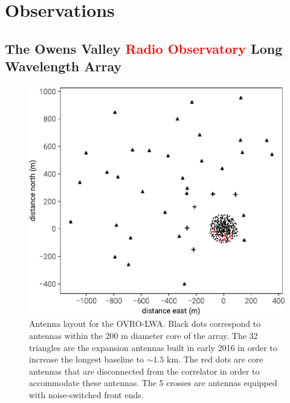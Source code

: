 \documentclass[twocolumn]{aastex61}
\newcommand{\revision}[1]{\textcolor{red}{\textbf{#1}}}
\begin{document}
\section{Observations}\label{sec:observations}

\subsection{The Owens Valley \revision{Radio Observatory} Long Wavelength Array}

\begin{figure}[t]
    \includegraphics[width=\columnwidth]{figures/antenna-layout/antenna-layout}
    \caption{
        Antenna layout for the OVRO-LWA. Black dots correspond to antennas within the 200 m diameter
        core of the array. The 32 triangles are the expansion antennas built in early 2016 in order
        to increase the longest baseline to $\sim1.5$ km. The red dots are core antennas that are
        disconnected from the correlator in order to accommodate these antennas. The 5 crosses are
        antennas equipped with noise-switched front ends.
    }
    \label{fig:antenna-layout}
\end{figure}
\end{document}
